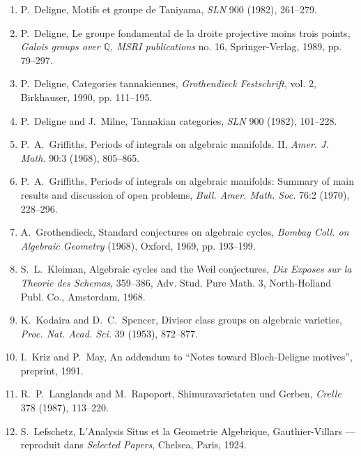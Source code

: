 \documentclass[11pt,a4paper]{article}
\theoremstyle{plain}
\theoremstyle{definition}
\newcommand{\Q}{\mathbb{Q}}
\begin{document}
\begin{enumerate}
\item[{[13]}] P.~Deligne, Motifs et groupe de Taniyama, \textit{SLN} 900 (1982), 261--279.

\item[{[14]}] P.~Deligne, Le groupe fondamental de la droite projective moins trois points, \textit{Galois groups over $\Q$, MSRI publications} no. 16, Springer-Verlag, 1989, pp. 79--297.

\item[{[15]}] P.~Deligne, Categories tannakiennes, \textit{Grothendieck Festschrift}, vol. 2, Birkhauser, 1990, pp. 111--195.

\item[{[16]}] P.~Deligne and J.~Milne, Tannakian categories, \textit{SLN} 900 (1982), 101--228.

\item[{[17]}] P.~A.~Griffiths, Periods of integrals on algebraic manifolds. II, \textit{Amer. J. Math.} 90:3 (1968), 805--865.

\item[{[18]}] P.~A.~Griffiths, Periods of integrals on algebraic manifolds: Summary of main results and discussion of open problems, \textit{Bull. Amer. Math. Soc.} 76:2 (1970), 228--296.

\item[{[19]}] A.~Grothendieck, Standard conjectures on algebraic cycles, \textit{Bombay Coll. on Algebraic Geometry} (1968), Oxford, 1969, pp. 193--199.

\item[{[20]}] S.~L.~Kleiman, Algebraic cycles and the Weil conjectures, \textit{Dix Exposes sur la Theorie des Schemas}, 359--386, Adv. Stud. Pure Math. 3, North-Holland Publ. Co., Amsterdam, 1968.

\item[{[21]}] K.~Kodaira and D.~C.~Spencer, Divisor class groups on algebraic varieties, \textit{Proc. Nat. Acad. Sci.} 39 (1953), 872--877.

\item[{[22]}] I.~Kriz and P.~May, An addendum to ``Notes toward Bloch-Deligne motives'', preprint, 1991.

\item[{[23]}] R.~P.~Langlands and M.~Rapoport, Shimuravarietaten und Gerben, \textit{Crelle} 378 (1987), 113--220.

\item[{[24]}] S.~Lefschetz, L'Analysis Situs et la Geometrie Algebrique, Gauthier-Villars --- reproduit dans \textit{Selected Papers}, Chelsea, Paris, 1924.


\end{enumerate}
\end{document}
